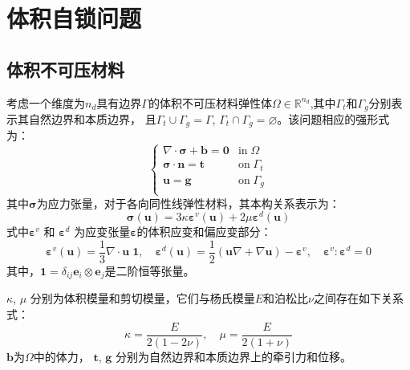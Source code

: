 \chapter{体积自锁问题}
\section{体积不可压材料}               
考虑一个维度为$n_d$具有边界$\Gamma$的体积不可压材料弹性体$\Omega\in \mathbb R^{n_d}$,其中$\Gamma_t$和$\Gamma_g$分别表示其自然边界和本质边界，
且$\Gamma_t \cup \Gamma_g = \Gamma$, $\Gamma_t \cap \Gamma_g = \varnothing$。该问题相应的强形式为：
\begin{equation}\label{strong_penalty}
    \begin{cases}
        \nabla \cdot \boldsymbol \sigma + \boldsymbol b = \boldsymbol 0 & \mathrm{in} \; \Omega \\
        \boldsymbol \sigma \cdot \boldsymbol n = \boldsymbol t & \mathrm{on} \; \Gamma_t \\
        \boldsymbol u = \boldsymbol g & \mathrm{on} \; \Gamma_g \\
\end{cases}
\end{equation}
其中$\boldsymbol \sigma$为应力张量，对于各向同性线弹性材料，其本构关系表示为：
\begin{equation}\label{stress_penalty}
    \boldsymbol \sigma(\boldsymbol u) = 3\kappa \boldsymbol \varepsilon^v(\boldsymbol u) + 2\mu \boldsymbol \varepsilon^d(\boldsymbol u) 
\end{equation}
式中$\boldsymbol \varepsilon^v$ 和 $\boldsymbol \varepsilon^d$ 为应变张量$\boldsymbol \varepsilon$的体积应变和偏应变部分：
\begin{equation}
    \boldsymbol \varepsilon^v(\boldsymbol u) =\frac{1}{3} \nabla \cdot \boldsymbol u \; \boldsymbol 1, \quad
    \boldsymbol \varepsilon^d(\boldsymbol u) =\frac{1}{2}(\boldsymbol u \nabla + \nabla \boldsymbol u) - \boldsymbol \varepsilon^v, \quad
    \boldsymbol \varepsilon^v : \boldsymbol \varepsilon^d = 0
\end{equation}
其中，$\boldsymbol 1 = \delta_{ij} \boldsymbol e_i \otimes \boldsymbol e_j$是二阶恒等张量。

$\kappa$, $\mu$ 分别为体积模量和剪切模量，它们与杨氏模量$E$和泊松比$\nu$之间存在如下关系式：
\begin{equation}\label{modulus}
    \kappa = \frac{E}{2(1-2\nu)}, \quad \mu = \frac{E}{2(1+\nu)}
\end{equation}
$\boldsymbol b$为$\Omega$中的体力， $\boldsymbol t$, $\boldsymbol g$ 分别为自然边界和本质边界上的牵引力和位移。

